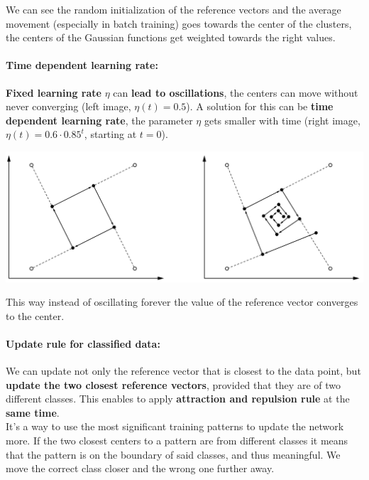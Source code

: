 \documentclass[11pt]{article}
\begin{document}
		We can see the random initialization of the reference vectors and the average movement (especially in batch training) goes towards the center of the clusters, the centers of the Gaussian functions get weighted towards the right values.\\
		
		\paragraph{Time dependent learning rate:} \textbf{Fixed learning rate} $\eta$ can \textbf{lead to oscillations}, the centers can move without never converging (left image, $\eta(t) = 0.5$). A solution for this can be \textbf{time dependent learning rate}, the parameter $\eta$ gets smaller with time (right image, $\eta(t) = 0.6 \cdot 0.85^t$, starting at $t=0$).
		\begin{center}
			\includegraphics[width=0.9\columnwidth]{img/NN/LVQ3}
		\end{center}
		This way instead of oscillating forever the value of the reference vector converges to the center.\\
		
		\newpage
		
		\paragraph{Update rule for classified data:} We can update not only the reference vector that is closest to the data point, but \textbf{update the two closest reference vectors}, provided that they are of two different classes. This enables to apply \textbf{attraction and repulsion rule} at the \textbf{same time}.\\
		
		It's a way to use the most significant training patterns to update the network more. If the two closest centers to a pattern are from different classes it means that the pattern is on the boundary of said classes, and thus meaningful. We move the correct class closer and the wrong one further away.\\
		
\end{document}
